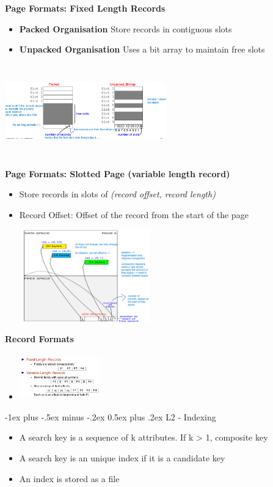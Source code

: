 \documentclass[10pt, landscape]{article}
\makeatletter
\renewcommand{\section}{\@startsection{section}{1}{0mm}%
                                {-1ex plus -.5ex minus -.2ex}%
                                {0.5ex plus .2ex}%
                                {\normalfont\large\bfseries}}
\makeatother
\begin{document}
\begin{multicols}{4}
\textbf{Page Formats: Fixed Length Records}
\begin{itemize}
  \item \textbf{Packed Organisation} Store records in contiguous slots
  \item \textbf{Unpacked Organisation} Uses a bit array to maintain free slots
\end{itemize}

\includegraphics*[width=7cm, height=4cm]{page_org.png}


\textbf{Page Formats: Slotted Page (variable length record)}
\begin{itemize}
  \item Store records in slots of \textsl{(record offset, record length)}
  \item Record Offset: Offset of the record from the start of the page
\end{itemize}

\includegraphics*[width=7cm, height=4cm]{slot_page.png}

\textbf{Record Formats}
\begin{itemize}
  \item \includegraphics[width=3.5cm, height=2cm]{var_record.png}
\end{itemize}


\section{L2 - Indexing}
\begin{itemize}
  \item A search key is a sequence of k attributes. If k > 1, composite key
  \item A search key is an unique index if it is a candidate key
  \item An index is stored as a file
\end{itemize}


\end{multicols}
\end{document}

